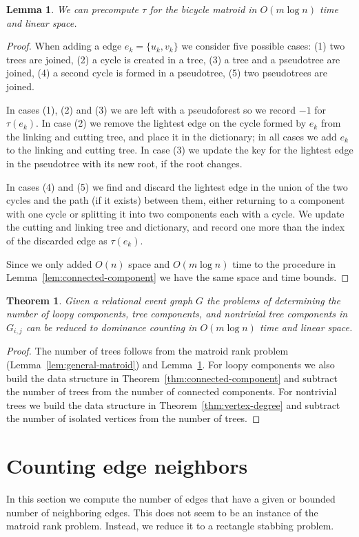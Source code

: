 \documentclass[11pt]{article}
\newtheorem{lemma}{Lemma}
\newtheorem{theorem}{Theorem}
\begin{document}
\begin{lemma}\label{lem:loopy-component}
We can precompute $\tau$ for the bicycle matroid in $O(m\log n)$ time and linear space.
\end{lemma}
\begin{proof}
When adding a edge $e_k = \{u_k, v_k\}$ we consider five possible cases: (1) two trees are joined, (2) a cycle is created in a tree,  (3) a tree and a pseudotree are joined, (4) a second cycle is formed in a pseudotree, (5) two pseudotrees are joined.

In cases (1), (2) and (3) we are left with a pseudoforest so we record $-1$ for $\tau(e_k)$. In case (2) we remove the lightest edge on the cycle formed by $e_k$ from the linking and cutting tree, and place it in the dictionary; in all cases we add $e_k$ to the linking and cutting tree. In case (3) we update the key for the lightest edge in the pseudotree with its new root, if the root changes.

In cases (4) and (5) we find and discard the lightest edge in the union of the two cycles and the path (if it exists) between them, 
either returning to a component with one cycle or splitting it into two components each with a cycle. We update the cutting and linking tree and dictionary, and record one more than the index of the discarded edge as $\tau(e_k)$.

Since we only added $O(n)$ space and $O(m\log n)$ time to the procedure in Lemma~\ref{lem:connected-component} we have the same space and time bounds.
\end{proof}

\begin{theorem}
Given a relational event graph $G$ the problems of determining the number of loopy components, tree components, and nontrivial tree components in $G_{i,j}$ can be reduced to dominance counting in $O(m\log n)$ time and linear space.
\end{theorem}
\begin{proof}
The number of trees follows from the matroid rank problem (Lemma~\ref{lem:general-matroid}) and Lemma~\ref{lem:loopy-component}. For loopy components we also build the data structure in Theorem~\ref{thm:connected-component} and subtract the number of trees from the number of connected components. For nontrivial trees we build the data structure in Theorem~\ref{thm:vertex-degree} and subtract the number of isolated vertices from the number of trees.
\end{proof}

\section{Counting edge neighbors}
In this section we compute the number of edges that have a given or bounded number of neighboring edges. This does not seem to be an instance of the matroid rank problem. Instead, we reduce it to a rectangle stabbing problem.
\end{document}
